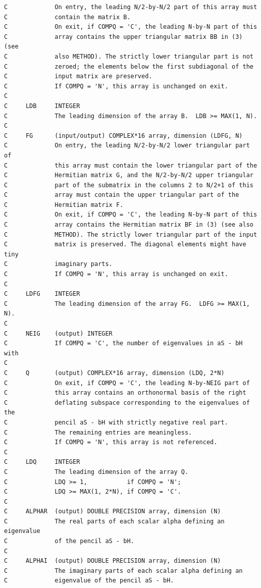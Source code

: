 \documentclass[a4paper,10pt]{article}
\begin{document}
\begin{verbatim}
C             On entry, the leading N/2-by-N/2 part of this array must
C             contain the matrix B.
C             On exit, if COMPQ = 'C', the leading N-by-N part of this
C             array contains the upper triangular matrix BB in (3) (see
C             also METHOD). The strictly lower triangular part is not
C             zeroed; the elements below the first subdiagonal of the
C             input matrix are preserved.
C             If COMPQ = 'N', this array is unchanged on exit.
C
C     LDB     INTEGER
C             The leading dimension of the array B.  LDB >= MAX(1, N).
C
C     FG      (input/output) COMPLEX*16 array, dimension (LDFG, N)
C             On entry, the leading N/2-by-N/2 lower triangular part of
C             this array must contain the lower triangular part of the
C             Hermitian matrix G, and the N/2-by-N/2 upper triangular
C             part of the submatrix in the columns 2 to N/2+1 of this
C             array must contain the upper triangular part of the
C             Hermitian matrix F.
C             On exit, if COMPQ = 'C', the leading N-by-N part of this
C             array contains the Hermitian matrix BF in (3) (see also
C             METHOD). The strictly lower triangular part of the input
C             matrix is preserved. The diagonal elements might have tiny
C             imaginary parts.
C             If COMPQ = 'N', this array is unchanged on exit.
C
C     LDFG    INTEGER
C             The leading dimension of the array FG.  LDFG >= MAX(1, N).
C
C     NEIG    (output) INTEGER
C             If COMPQ = 'C', the number of eigenvalues in aS - bH with
C
C     Q       (output) COMPLEX*16 array, dimension (LDQ, 2*N)
C             On exit, if COMPQ = 'C', the leading N-by-NEIG part of
C             this array contains an orthonormal basis of the right
C             deflating subspace corresponding to the eigenvalues of the
C             pencil aS - bH with strictly negative real part.
C             The remaining entries are meaningless.
C             If COMPQ = 'N', this array is not referenced.
C
C     LDQ     INTEGER
C             The leading dimension of the array Q.
C             LDQ >= 1,           if COMPQ = 'N';
C             LDQ >= MAX(1, 2*N), if COMPQ = 'C'.
C
C     ALPHAR  (output) DOUBLE PRECISION array, dimension (N)
C             The real parts of each scalar alpha defining an eigenvalue
C             of the pencil aS - bH.
C
C     ALPHAI  (output) DOUBLE PRECISION array, dimension (N)
C             The imaginary parts of each scalar alpha defining an
C             eigenvalue of the pencil aS - bH.

\end{verbatim}
\end{document}
